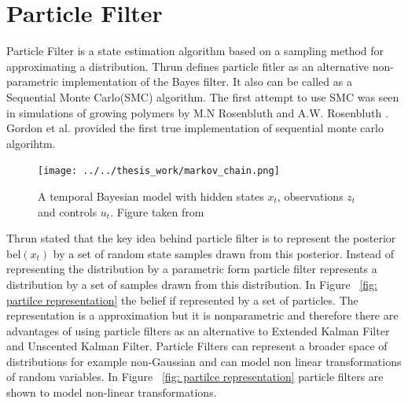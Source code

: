 \documentclass[12pt,draft]{dalcsthesis}
\begin{document}
\section{Particle Filter}
Particle Filter is a state estimation algorithm based on a sampling method for approximating a distribution. Thrun \cite{thrun2005probabilistic} defines particle fitler as an alternative non-parametric implementation of the Bayes filter. It also can be called as a Sequential Monte Carlo(SMC) algorithm. The first attempt to use SMC was seen in simulations of growing polymers by M.N Rosenbluth and A.W. Rosenbluth \cite{rosenbluth1955monte}. Gordon et al. \cite{gordon1993novel} provided the first true implementation of sequential monte carlo algorihtm. 

\begin{figure}
  \centering
     {\texttt{[image: ../../thesis\_work/markov\_chain.png]}}
  \caption{\label{fig-Markov Chain} A temporal Bayesian model with hidden states $x_{t}$, observations $z_{t}$ and controls $u_{t}$. Figure taken from \cite{thrun2005probabilistic}}
\end{figure}

Thrun \cite{thrun2005probabilistic} stated that the key idea behind particle filter is to represent the posterior bel$(x_{t})$ by a set of random state samples drawn from this posterior. Instead of representing the distribution by a parametric form particle filter represents a distribution by a set of samples drawn from this distribution. In Figure ~\ref{fig: partilce representation} the belief if represented by a set of particles. The representation is a approximation but it is nonparametric and therefore there are advantages of using particle filters as an alternative to Extended Kalman Filter and Unscented Kalman Filter. Particle Filters can represent a broader space of distributions for example non-Gaussian and can model non linear transformations of random variables. In Figure ~\ref{fig: partilce representation} particle filters are shown to model non-linear transformations. 
\end{document}
